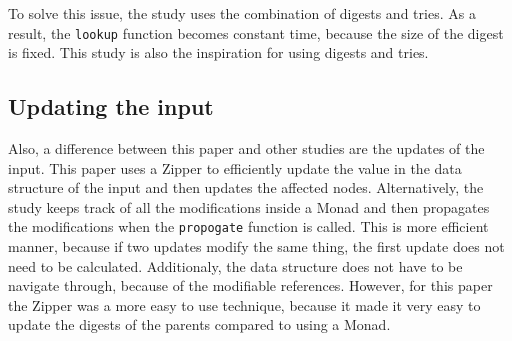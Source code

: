 To solve this issue, the study  uses the combination of digests and tries. As a result, the \texttt{lookup} function becomes constant time, because the size of the digest is fixed. This study is also the inspiration for using digests and tries.

\subsection{Updating the input}
Also, a difference between this paper and other studies are the updates of the input. This paper uses a Zipper to efficiently update the value in the data structure of the input and then updates the affected nodes. Alternatively, the study \cite{carlsson2002monads} keeps track of all the modifications inside a Monad and then propagates the modifications when the \texttt{propogate} function is called. This is more efficient manner, because if two updates modify the same thing, the first update does not need to be calculated. Additionaly, the data structure does not have to be navigate through, because of the modifiable references. However, for this paper the Zipper was a more easy to use technique, because it made it very easy to update the digests of the parents compared to using a Monad.